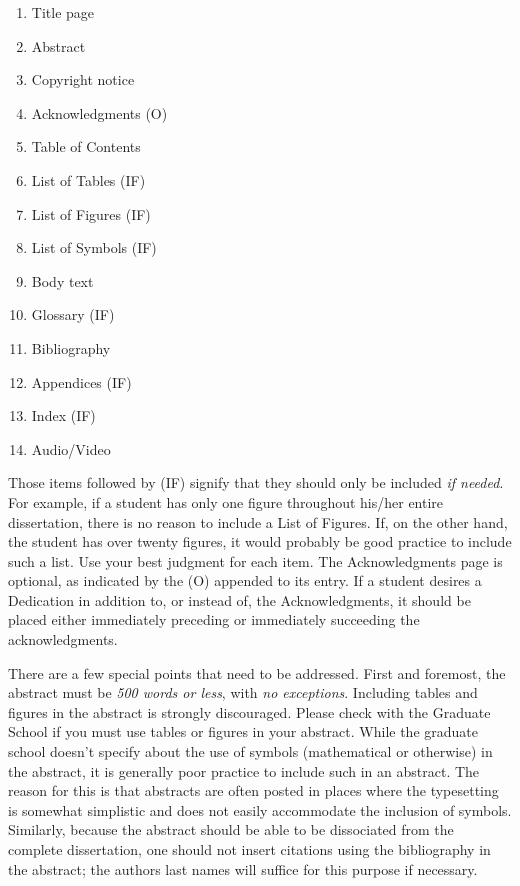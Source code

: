 \documentclass{article}
\begin{document}
\begin{multicols}{2}
  \begin{enumerate}
  \item Title page
  \item Abstract
  \item Copyright notice
  \item Acknowledgments (O)
  \item Table of Contents
  \item List of Tables (IF)
  \item List of Figures (IF)
  \item List of Symbols (IF)
  \item Body text
  \item Glossary (IF)
  \item Bibliography
  \item Appendices (IF)
  \item Index (IF)
  \item Audio/Video
  \end{enumerate}
\end{multicols}

Those items followed by (IF) signify that they should only be included \emph{if needed}. 
For example, if a student has only one figure throughout his/her entire dissertation, there is no reason to include a List of Figures.
If, on the other hand, the student has over twenty figures, it would probably be good practice to include such a list. 
Use your best judgment for each item. The Acknowledgments page is optional, as indicated by the (O) appended to its entry. 
If a student desires a Dedication in addition to, or instead of, the Acknowledgments, it should be placed either immediately preceding or immediately succeeding the acknowledgments.

There are a few special points that need to be addressed. 
First and foremost, the abstract must be \emph{500 words or less}, with \emph{no exceptions}. 
Including tables and figures in the abstract is strongly discouraged. 
Please check with the Graduate School if you must use tables or figures in your abstract. 
While the graduate school doesn't specify about the use of symbols (mathematical or otherwise) in the abstract, it is generally poor practice to include such in an abstract. 
The reason for this is that abstracts are often posted in places where the typesetting is somewhat simplistic and does not easily accommodate the inclusion of symbols. 
Similarly, because the abstract should be able to be dissociated from the complete dissertation, one should not insert citations using the bibliography in the abstract; the authors last names will suffice for this purpose if necessary. 
\end{document}
